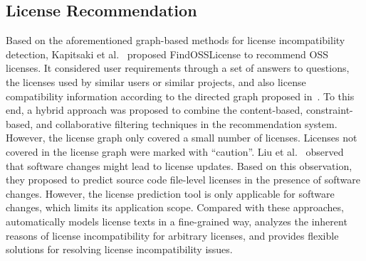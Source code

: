 \subsection{License Recommendation}
Based on the aforementioned graph-based methods for license incompatibility detection, Kapitsaki et al.~\cite{kapitsaki2019modeling} proposed FindOSSLicense to recommend OSS licenses. It considered user requirements through a set of answers to questions, the licenses used by  similar users or similar projects, and also license compatibility information according to the directed graph proposed in~\cite{jss`17-Kapitsaki-SPDX}. To this end, a hybrid approach was proposed to combine the content-based, constraint-based, and
collaborative filtering techniques in the recommendation system. 
However, the license graph only covered a small number of licenses. Licenses not covered in the license graph were marked with ``caution''. %
Liu et al.~\cite{liu2019predicting} observed that software changes might lead to license updates. Based on this observation, they proposed to predict source code
file-level licenses in the
presence of software changes. %
However, the license prediction tool is only applicable for software changes, which limits its application scope. %
Compared with these approaches,
\tool automatically models license texts in a fine-grained way, analyzes the inherent reasons of license incompatibility for arbitrary licenses, and provides flexible solutions for resolving license incompatibility issues. %
